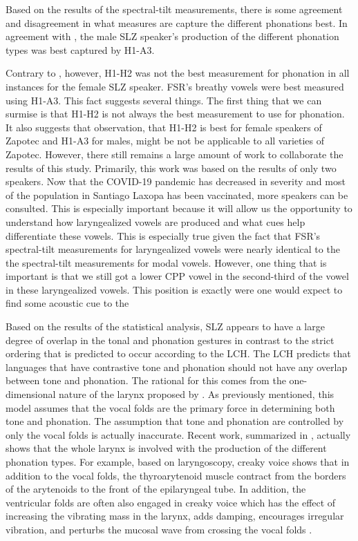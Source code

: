 \documentclass[12pt, letterpaper]{article}
\begin{document}
Based on the results of the spectral-tilt measurements, there is some agreement and disagreement in what measures are capture the different phonations best. In agreement with \citet{espositoVariationContrastivePhonation2010}, the male SLZ speaker's production of the different phonation types was best captured by H1-A3. 

Contrary to \citet{espositoVariationContrastivePhonation2010}, however, H1-H2 was not the best measurement for phonation in all instances for the female SLZ speaker. FSR's breathy vowels were best measured using H1-A3. This fact suggests several things. The first thing that we can surmise is that H1-H2 is not always the best measurement to use for phonation. It also suggests that  observation, that H1-H2 is best for female speakers of Zapotec and H1-A3 for males, might be not be applicable to all varieties of Zapotec. However, there still remains a large amount of work to collaborate the results of this study. Primarily, this work was based on the results of only two speakers. Now that the COVID-19 pandemic has decreased in severity and most of the population in Santiago Laxopa has been vaccinated, more speakers can be consulted. This is especially important because it will allow us the opportunity to understand how laryngealized vowels are produced and what cues help differentiate these vowels. This is especially true given the fact that FSR's spectral-tilt measurements for laryngealized vowels were nearly identical to the the spectral-tilt measurements for modal vowels. However, one thing that is important is that we still got a lower CPP vowel in the second-third of the vowel in these laryngealized vowels. This position is exactly were one would expect to find some acoustic cue to the 

Based on the results of the statistical analysis, SLZ appears to have a large degree of overlap in the tonal and phonation gestures in contrast to the strict ordering that is predicted to occur according to the LCH. The LCH predicts that languages that have contrastive tone and phonation should not have any overlap between tone and phonation. The rational for this comes from the one-dimensional nature of the larynx proposed by \citet{ladefogedPreliminariesLinguisticPhonetics1971}. As previously mentioned, this model assumes that the vocal folds are the primary force in determining both tone and phonation. The assumption that tone and phonation are controlled by only the vocal folds is actually inaccurate. Recent work, summarized in \citet{eslingVoiceQualityLaryngeal2019}, actually shows that the whole larynx is involved with the production of the different phonation types. For example, based on laryngoscopy, creaky voice shows that in addition to the vocal folds, the thyroarytenoid muscle contract from the borders of the arytenoids to the front of the epilaryngeal tube. In addition, the ventricular folds are often also engaged in creaky voice which has the effect of increasing the vibrating mass in the larynx, adds damping, encourages irregular vibration, and perturbs the mucosal wave from crossing the vocal folds \citep{moisikModelingBiomechanicalInfluence2014}. 
\end{document}
